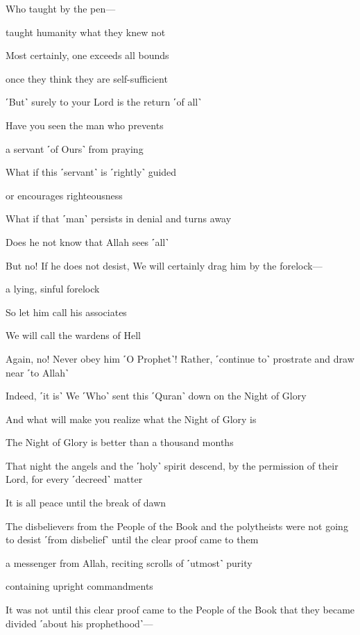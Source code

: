 Who taught by the pen—

taught humanity what they knew not

Most certainly, one exceeds all bounds

once they think they are self-sufficient

˹But˺ surely to your Lord is the return ˹of all˺

Have you seen the man who prevents

a servant ˹of Ours˺ from praying

What if this ˹servant˺ is ˹rightly˺ guided

or encourages righteousness

What if that ˹man˺ persists in denial and turns away

Does he not know that Allah sees ˹all˺

But no! If he does not desist, We will certainly drag him by the forelock—

a lying, sinful forelock

So let him call his associates

We will call the wardens of Hell

Again, no! Never obey him ˹O Prophet˺! Rather, ˹continue to˺ prostrate and draw near ˹to Allah˺

Indeed, ˹it is˺ We ˹Who˺ sent this ˹Quran˺ down on the Night of Glory

And what will make you realize what the Night of Glory is

The Night of Glory is better than a thousand months

That night the angels and the ˹holy˺ spirit descend, by the permission of their Lord, for every ˹decreed˺ matter

It is all peace until the break of dawn

The disbelievers from the People of the Book and the polytheists were not going to desist ˹from disbelief˺ until the clear proof came to them

a messenger from Allah, reciting scrolls of ˹utmost˺ purity

containing upright commandments

It was not until this clear proof came to the People of the Book that they became divided ˹about his prophethood˺—

